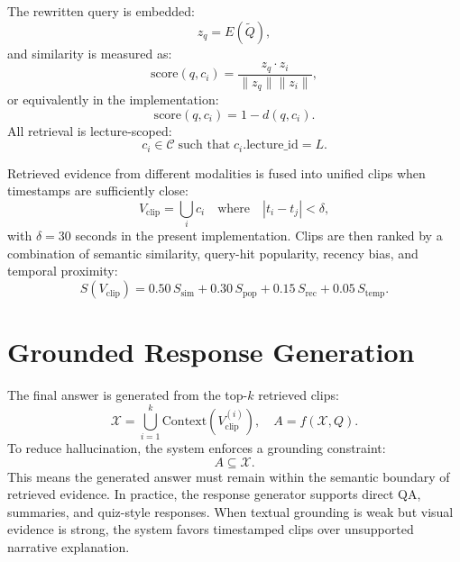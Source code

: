 \documentclass[12pt,a4paper,oneside]{report}
\begin{document}
The rewritten query is embedded:
\begin{equation}
z_q = E(\tilde{Q}),
\end{equation}
and similarity is measured as:
\begin{equation}
\text{score}(q,c_i) = \frac{z_q \cdot z_i}{\|z_q\| \|z_i\|},
\end{equation}
or equivalently in the implementation:
\begin{equation}
\text{score}(q,c_i)=1-d(q,c_i).
\end{equation}
All retrieval is lecture-scoped:
\begin{equation}
c_i \in \mathcal{C} \;\text{such that}\; c_i.\text{lecture\_id}=L.
\end{equation}

Retrieved evidence from different modalities is fused into unified clips when timestamps are sufficiently close:
\begin{equation}
V_{\text{clip}} = \bigcup_i c_i \quad \text{where} \quad |t_i - t_j| < \delta,
\end{equation}
with $\delta = 30$ seconds in the present implementation. Clips are then ranked by a combination of semantic similarity, query-hit popularity, recency bias, and temporal proximity:
\begin{equation}
S(V_{\text{clip}})=0.50\,S_{\text{sim}} + 0.30\,S_{\text{pop}} + 0.15\,S_{\text{rec}} + 0.05\,S_{\text{temp}}.
\end{equation}

\section{Grounded Response Generation}
The final answer is generated from the top-$k$ retrieved clips:
\begin{equation}
\mathcal{X} = \bigcup_{i=1}^{k} \text{Context}(V_{\text{clip}}^{(i)}), \quad
A = f(\mathcal{X}, Q).
\end{equation}
To reduce hallucination, the system enforces a grounding constraint:
\begin{equation}
A \subseteq \mathcal{X}.
\end{equation}
This means the generated answer must remain within the semantic boundary of retrieved evidence. In practice, the response generator supports direct QA, summaries, and quiz-style responses. When textual grounding is weak but visual evidence is strong, the system favors timestamped clips over unsupported narrative explanation.
\end{document}
